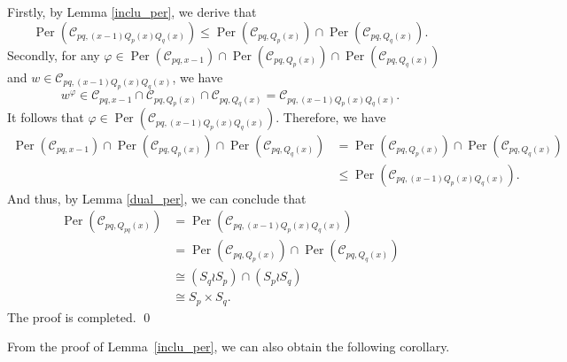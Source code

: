 \documentclass[journal,12pt,onecolumn]{IEEEtran}
\begin{document}
  
 Firstly, by Lemma \ref{inclu_per}, we derive that
\[
    \operatorname{Per}(\mathcal{C}_{pq,(x-1)Q_p(x)Q_q(x)})\leqslant \operatorname{Per}(\mathcal{C}_{pq,Q_p(x)})\cap\operatorname{Per}(\mathcal{C}_{pq,Q_q(x)}). 
\]
Secondly, for any $\varphi\in \operatorname{Per}(\mathcal{C}_{pq,x-1})\cap\operatorname{Per}(\mathcal{C}_{pq,Q_p(x)})\cap\operatorname{Per}(\mathcal{C}_{pq,Q_q(x)})$ and $w\in \mathcal{C}_{pq,(x-1)Q_p(x)Q_q(x)}$, we have
\[
    w^\varphi\in \mathcal{C}_{pq,x-1}\cap\mathcal{C}_{pq,Q_p(x)}\cap\mathcal{C}_{pq,Q_q(x)} = \mathcal{C}_{pq,(x-1)Q_p(x)Q_q(x)}.
\]
It follows that $\varphi \in \operatorname{Per}(\mathcal{C}_{pq,(x-1)Q_p(x)Q_q(x)})$. Therefore, we have
\begin{align*}
    \operatorname{Per}(\mathcal{C}_{pq,x-1})\cap\operatorname{Per}(\mathcal{C}_{pq,Q_p(x)})\cap\operatorname{Per}(\mathcal{C}_{pq,Q_q(x)}) &= \operatorname{Per}(\mathcal{C}_{pq,Q_p(x)})\cap\operatorname{Per}(\mathcal{C}_{pq,Q_q(x)}) \\
    &\leqslant \operatorname{Per}(\mathcal{C}_{pq,(x-1)Q_p(x)Q_q(x)}).
\end{align*}
And thus, by Lemma \ref{dual_per}, we can conclude that
\begin{align*}
    \operatorname{Per}(\mathcal{C}_{pq,Q_{pq}(x)}) &= \operatorname{Per}(\mathcal{C}_{pq,(x-1)Q_p(x)Q_q(x)}) \\
        &= \operatorname{Per}(\mathcal{C}_{pq,Q_p(x)})\cap \operatorname{Per}(\mathcal{C}_{pq,Q_q(x)}) \\
        &\cong (S_q \wr S_p)\cap(S_p \wr S_q) \\
        &\cong S_p\times S_q. 
\end{align*}
The proof is completed. \qed

 
From the proof of Lemma~\ref{inclu_per}, we can also obtain the following corollary. 
\end{document}
